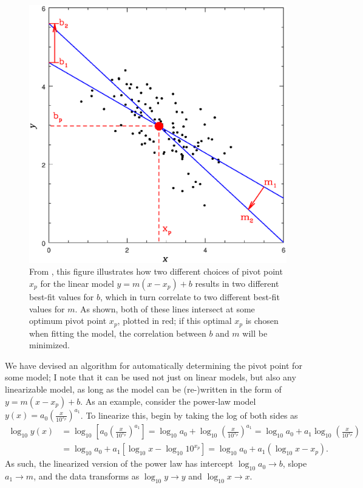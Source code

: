 \begin{figure}
    \centering
    \includegraphics[width=0.8\linewidth]{figures/fig_pivot.eps}
    \caption{From \textcite{trotter}, this figure illustrates how two different choices of pivot point $x_p$ for the linear model $y=m(x-x_p)+b$ results in two different best-fit values for $b$, which in turn correlate to two different best-fit values for $m$. As shown, both of these lines intersect at some optimum pivot point $x_p$, plotted in red; if this optimal $x_p$ is chosen when fitting the model, the correlation between $b$ and $m$ will be minimized.}
    \label{fig:pivotpoint}
\end{figure}

We have devised an algorithm for automatically determining the pivot point for some model; I note that it can be used not just on linear models, but also any linearizable model, as long as the model can be (re-)written in the form of $y=m(x-x_p)+b$. As an example, consider the power-law model $\displaystyle y(x)=a_0\left(\frac{x}{10^{x_p}}\right)^{a_1}$. To linearize this, begin by taking the log of both sides as
\begin{equation}
\begin{split}
    \log_{10}y(x)&=\log_{10}\left[a_0\left(\frac{x}{10^{x_p}}\right)^{a_1}\right]=\log_{10}a_0 + \log_{10}\left(\frac{x}{10^{x_p}}\right)^{a_1}=\log_{10}a_0 + a_1\log_{10}\left(\frac{x}{10^{x_p}}\right)\\&= \log_{10}a_0 + a_1\left[\log_{10}x - \log_{10}10^{x_p}\right] = \log_{10}a_0 + a_1\left(\log_{10}x - x_p\right).
\end{split}
\end{equation}
As such, the linearized version of the power law has intercept $\log_{10}a_0\rightarrow b$, slope $a_1\rightarrow m$, and the data transforms as $\log_{10}y\rightarrow y$ and $\log_{10}x\rightarrow x$.

